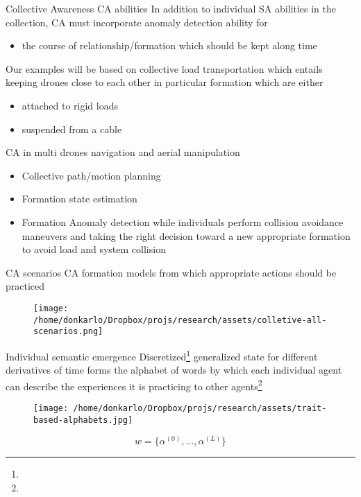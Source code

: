 \documentclass[unknownkeysallowed]{beamer}
\begin{document}
	\begin{frame}{Collective Awareness {CA} abilities}
		In addition to individual SA abilities in the collection, CA must incorporate anomaly detection ability for 
		\begin{itemize}
			\item the course of relationship/formation which should be kept along time
		\end{itemize}
		Our examples  will be based on collective load transportation which entails keeping drones close to each other in particular formation which are either
		\begin{itemize}
			\item attached to rigid loads
			\item suspended from a cable
		\end{itemize}
	\end{frame}

	\begin{frame}{CA in multi drones navigation and aerial manipulation}
		\begin{itemize}
			\item Collective path/motion planning
			\item Formation state estimation
			\item Formation Anomaly detection while individuals perform collision avoidance maneuvers and taking the right decision toward a new appropriate formation to avoid load and system collision
		\end{itemize}
	\end{frame}

	\begin{frame}{CA scenarios}
		CA formation models from which appropriate actions should be practiced
		\begin{figure}
			\texttt{[image: /home/donkarlo/Dropbox/projs/research/assets/colletive-all-scenarios.png]}
			\caption{}
		\end{figure}
	\end{frame}

	\begin{frame}{Individual semantic emergence}
		Discretized\footnote{} generalized state for different derivatives of time forms the alphabet of words by which each individual agent can describe the experiences it is practicing to other agents\footnote{}
		\begin{figure}
			\texttt{[image: /home/donkarlo/Dropbox/projs/research/assets/trait-based-alphabets.jpg]}
			\caption{}
		\end{figure}
		\begin{equation}
			w = \{\alpha^{(0)},...,\alpha^{(L)}\}
		\end{equation}
	\end{frame}
\end{document}
